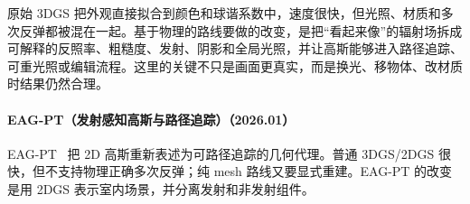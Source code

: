 原始 3DGS 把外观直接拟合到颜色和球谐系数中，速度很快，但光照、材质和多次反弹都被混在一起。基于物理的路线要做的改变，是把“看起来像”的辐射场拆成可解释的反照率、粗糙度、发射、阴影和全局光照，并让高斯能够进入路径追踪、可重光照或编辑流程。这里的关键不只是画面更真实，而是换光、移物体、改材质时结果仍然合理。



\paragraph{EAG-PT（发射感知高斯与路径追踪）（2026.01）}
EAG-PT~\cite{2601_23065} 把 2D 高斯重新表述为可路径追踪的几何代理。普通 3DGS/2DGS 很快，但不支持物理正确多次反弹；纯 mesh 路线又要显式重建。EAG-PT 的改变是用 2DGS 表示室内场景，并分离发射和非发射组件。

